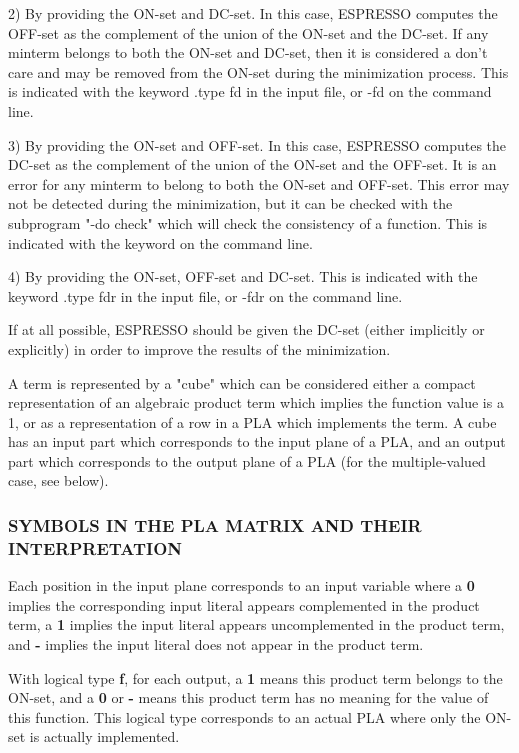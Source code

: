 {\begin{pespace}
     2)   By providing the ON-set and DC-set.  In this case,
          ESPRESSO computes the OFF-set as the complement of the
          union of the ON-set and the DC-set.  If any minterm
          belongs to both the ON-set and DC-set, then it is considered 
a don't care and may be removed from the ON-set
          during the minimization process.  This is indicated
          with the keyword .type fd in the input file, or -fd on
          the command line.

     3)   By providing the ON-set and OFF-set.  In this case,
          ESPRESSO computes the DC-set as the complement of the
          union of the ON-set and the OFF-set.  It is an error
          for any minterm to belong to both the ON-set and OFF-set.  
This error may not be detected during the minimization, 
but it can be checked with the subprogram "-do check" 
which will check the consistency of a function.
          This is indicated with the keyword on the command line.

     4)   By providing the ON-set, OFF-set and DC-set.  This is
          indicated with the keyword .type fdr in the input file,
          or -fdr on the command line.

     If at all possible, ESPRESSO should be given the DC-set
     (either implicitly or explicitly) in order to improve the
     results of the minimization.

     A term is represented by a "cube" which can be considered
     either a compact representation of an algebraic product term
     which implies the function value is a 1, or as a representation
 of a row in a PLA which implements the term.  A cube
     has an input part which corresponds to the input plane of a
     PLA, and an output part which corresponds to the output
     plane of a PLA (for the multiple-valued case, see below).


\subsubsection{SYMBOLS IN THE PLA MATRIX AND THEIR INTERPRETATION}
     Each position in the input plane corresponds to an input
     variable where a {\bf 0} implies the corresponding input literal
     appears complemented in the product term, a {\bf 1} implies the
     input literal appears uncomplemented in the product term,
     and {\bf -} implies the input literal does not appear in the 
product term.

     With logical type {\bf f}, for each output, a {\bf 1} means this product
     term belongs to the ON-set, and a {\bf 0} or {\bf -} means this product
     term has no meaning for the value of this function.  This
     logical type corresponds to an actual PLA where only the
     ON-set is actually implemented.


\end{pespace}}
